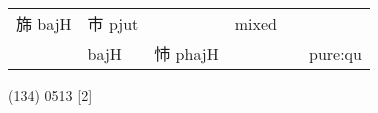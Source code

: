 \documentclass[14pt,a4paper]{scrartcl}
\begin{document}
\begin{longtable}[c]{@{}llllll@{}}
\begin{minipage}[t]{0.14\columnwidth}
旆 bajH
\strut\end{minipage} &
\begin{minipage}[t]{0.14\columnwidth}\raggedright\strut
巿 pjut
\strut\end{minipage} &
\begin{minipage}[t]{0.14\columnwidth}\raggedright\strut
\strut\end{minipage} &
\begin{minipage}[t]{0.14\columnwidth}\raggedright\strut
mixed
\strut\end{minipage}\tabularnewline
\begin{minipage}[t]{0.14\columnwidth}\raggedright\strut
𣎵
\strut\end{minipage} &
\begin{minipage}[t]{0.14\columnwidth}\raggedright\strut
bajH
\strut\end{minipage} &
\begin{minipage}[t]{0.14\columnwidth}\raggedright\strut
㤄 phajH
\strut\end{minipage} &
\begin{minipage}[t]{0.14\columnwidth}\raggedright\strut
\strut\end{minipage} &
\begin{minipage}[t]{0.14\columnwidth}\raggedright\strut
\strut\end{minipage} &
\begin{minipage}[t]{0.14\columnwidth}\raggedright\strut
pure:qu
\strut\end{minipage}\tabularnewline
\bottomrule
\end{longtable}

(134) 0513 {[}2{]}
\end{document}
